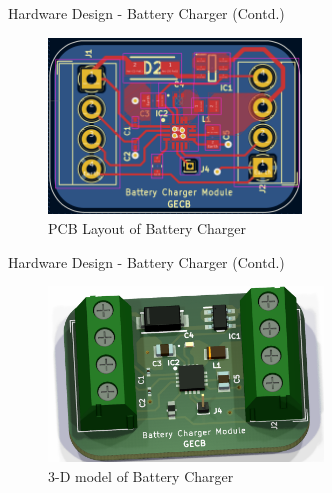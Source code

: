 \documentclass[aspectratio=169]{beamer}
\begin{document}
		
		\begin{frame}{Hardware Design - Battery Charger (Contd.) }
			\begin{figure}[h]
				\centering
				\includegraphics[width=0.6\textwidth]{diag/charg pcb.png}
				\caption{PCB Layout of Battery Charger}
				\label{fig:mesh1}
			\end{figure}
		\end{frame}
		\begin{frame}{Hardware Design - Battery Charger (Contd.) }
			\begin{figure}[h]
				\centering
				\includegraphics[width=0.65\textwidth]{diag/charg 3d.png}
				\caption{3-D model of Battery Charger}
				\label{fig:mesh1}
			\end{figure}
		\end{frame}
		
\end{document}
